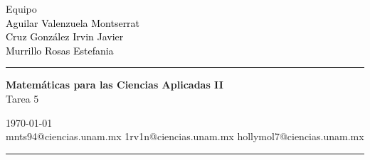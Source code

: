 \documentclass[a4paper,10pt]{article}
\begin{document}
\fancyhead[C]{}
\begin{minipage}{0.295\textwidth} 
\raggedright
Equipo\\    
\footnotesize 
\colorbox[rgb]{0.5, 1.0, 0.83}{\textcolor{black}{Aguilar Valenzuela Montserrat}}
\\\colorbox[rgb]{0.94, 0.86, 0.51}{\textcolor{black}{Cruz González Irvin Javier}}
\\\colorbox[rgb]{0.99, 0.76, 0.8}{\textcolor{black}{Murrillo Rosas Estefania}}
\textcolor[rgb]{0.91, 1.0, 1.0}{\medskip\hrule}
\end{minipage}
\begin{minipage}{0.4\textwidth} 
\centering 
\large 
\textbf{Matemáticas para las Ciencias Aplicadas II}\\ 
\normalsize 
Tarea 5\\
\end{minipage}
\begin{minipage}{0.295\textwidth} 
\raggedleft
\today\\ 
\footnotesize
mnts94@ciencias.unam.mx
1rv1n@ciencias.unam.mx
hollymol7@ciencias.unam.mx 
\textcolor[rgb]{0.91, 1.0, 1.0}{\medskip\hrule}
\end{minipage}

\end{document}
